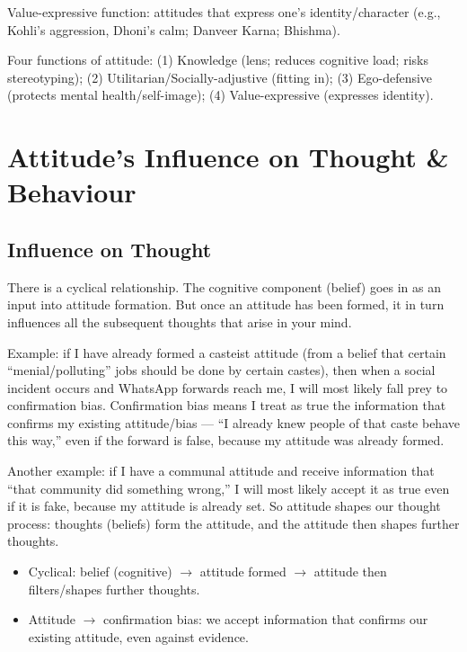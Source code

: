 \begin{KeyConcept}
Value-expressive function: attitudes that express one's identity/character (e.g., Kohli's aggression, Dhoni's calm; Danveer Karna; Bhishma).
\end{KeyConcept}

\begin{QuickRevision}
Four functions of attitude: (1) Knowledge (lens; reduces cognitive load; risks stereotyping); (2) Utilitarian/Socially-adjustive (fitting in); (3) Ego-defensive (protects mental health/self-image); (4) Value-expressive (expresses identity).
\end{QuickRevision}

\section{Attitude's Influence on Thought \& Behaviour}

\subsection{Influence on Thought}

There is a cyclical relationship. The cognitive component (belief) goes in as an input into attitude formation. But once an attitude has been formed, it in turn influences all the subsequent thoughts that arise in your mind.

Example: if I have already formed a casteist attitude (from a belief that certain ``menial/polluting'' jobs should be done by certain castes), then when a social incident occurs and WhatsApp forwards reach me, I will most likely fall prey to confirmation bias. Confirmation bias means I treat as true the information that confirms my existing attitude/bias --- ``I already knew people of that caste behave this way,'' even if the forward is false, because my attitude was already formed.

Another example: if I have a communal attitude and receive information that ``that community did something wrong,'' I will most likely accept it as true even if it is fake, because my attitude is already set. So attitude shapes our thought process: thoughts (beliefs) form the attitude, and the attitude then shapes further thoughts.

\begin{KeyConcept}
\begin{itemize}
\item Cyclical: belief (cognitive) $\rightarrow$ attitude formed $\rightarrow$ attitude then filters/shapes further thoughts.
\item Attitude $\rightarrow$ confirmation bias: we accept information that confirms our existing attitude, even against evidence.
\end{itemize}
\end{KeyConcept}

